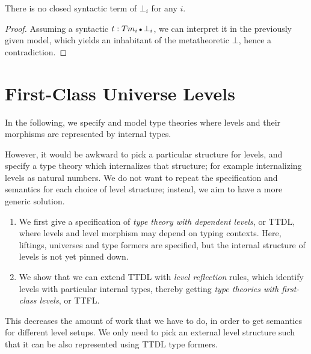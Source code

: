 \documentclass[a4paper,UKenglish,cleveref, autoref, thm-restate]{lipics-v2021}
\theoremstyle{remark}
\theoremstyle{definition}
\newcommand{\Tm}{\mathsf{Tm}}
\newcommand{\emptycon}{\scaleobj{.75}\bullet}
\begin{document}
\begin{theorem}
There is no closed syntactic term of $\bot_i$ for any $i$.
\end{theorem}
\begin{proof}
Assuming a syntactic $t : \Tm_i\,\emptycon\,\bot_i$, we can interpret it in the
previously given model, which yields an inhabitant of the metatheoretic $\bot$,
hence a contradiction.
\end{proof}


\section{First-Class Universe Levels}
\label{sec:ttfl}

In the following, we specify and model type theories where levels and
their morphisms are represented by internal types.

However, it would be awkward to pick a particular structure for levels, and
specify a type theory which internalizes that structure; for example
internalizing levels as natural numbers. We do not want to repeat the
specification and semantics for each choice of level structure; instead, we aim
to have a more generic solution.
\begin{enumerate}
  \item We first give a specification of \emph{type theory with dependent
        levels}, or TTDL, where levels and level morphism may depend on typing contexts.
        Here, liftings, universes and type formers are specified, but the internal
        structure of levels is not yet pinned down.
  \item We show that we can extend TTDL with \emph{level reflection} rules, which identify
        levels with particular internal types, thereby getting \emph{type theories with first-class
        levels}, or TTFL.
\end{enumerate}
This decreases the amount of work that we have to do, in order to get semantics
for different level setups. We only need to pick an external level structure
such that it can be also represented using TTDL type formers.
\end{document}

